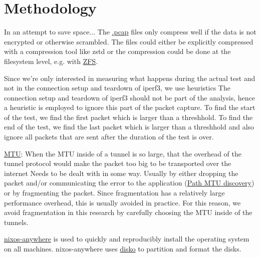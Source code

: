 
\chapter{Methodology}

In an attempt to save space...
The \href{https://en.wikipedia.org/wiki/Pcap}{.pcap} files only compress well if the data is not encrypted or otherwise scrambled.
The files could either be explicitly compressed with a compression tool like zstd or the compression could be done at the filesystem level, e.g. with \href{https://openzfs.org/wiki/Main_Page}{ZFS}.


Since we're only interested in measuring what happens during the actual test and not in the connection setup and teardown of iperf3, we use heuristics
The connection setup and teardown of iperf3 should not be part of the analysis, hence a heuristic is employed to ignore this part of the packet capture. To find the start of the test, we find the first packet which is larger than a threshhold. To find the end of the test, we find the last packet which is larger than a threshhold and also ignore all packets that are sent after the duration of the test is over.

\href{https://en.wikipedia.org/wiki/Maximum_transmission_unit}{MTU}:
When the MTU inside of a tunnel is so large, that the overhead of the tunnel protocol would make the packet too big to be transported over the internet
Needs to be dealt with in some way. Usually by either dropping the packet and/or communicating the error to the application (\href{https://en.wikipedia.org/wiki/Path_MTU_Discovery}{Path MTU discovery}) or by fragmenting the packet. Since fragmentation has a relatively large performance overhead, this is usually avoided in practice. For this reason, we avoid fragmentation in this research by carefully choosing the MTU inside of the tunnels.


\href{https://github.com/nix-community/nixos-anywhere}{nixos-anywhere} is used to quickly and reproducibly install the operating system on all machines.
nixos-anywhere uses \href{https://github.com/nix-community/disko}{disko} to partition and format the disks.



